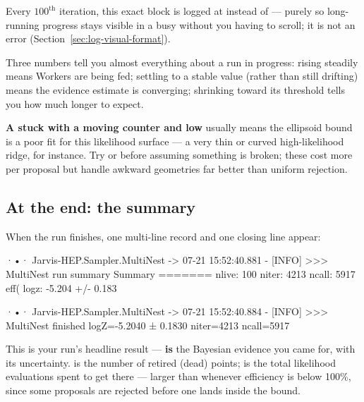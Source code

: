 \begin{jnote}
Every $100^{\text{th}}$ iteration, this exact block is logged at \code{[WARNING]}
instead of \code{[INFO]} --- purely so long-running progress stays visible in a busy
 without you having to scroll; it is not an error
(Section~\ref{sec:log-visual-format}).
\end{jnote}

\begin{jtip}
Three numbers tell you almost everything about a run in progress:  rising
steadily means Workers are being fed;  settling to a stable value (rather
than still drifting) means the evidence estimate is converging; 
shrinking toward its threshold tells you how much longer to expect.
\end{jtip}

\begin{jwarn}
\textbf{A stuck  with a moving  counter and low }
usually means the ellipsoid bound is a poor fit for this likelihood surface --- a very
thin or curved high-likelihood ridge, for instance. Try  or
 before assuming something is broken; these cost more per
proposal but handle awkward geometries far better than uniform rejection.
\end{jwarn}

\subsection{At the end: the summary}
\label{sec:nested-log-summary}

When the run finishes, one multi-line record and one closing line appear:

\begin{terminal}
\begin{jout}
·•· Jarvis-HEP.Sampler.MultiNest
	-> 07-21 15:52:40.881 - [INFO] >>>
MultiNest run summary
Summary
=======
nlive: 100
niter: 4213
ncall: 5917
eff(%
logz: -5.204 +/- 0.183

·•· Jarvis-HEP.Sampler.MultiNest
	-> 07-21 15:52:40.884 - [INFO] >>>
MultiNest finished logZ=-5.2040 ± 0.1830 niter=4213 ncall=5917
\end{jout}
\end{terminal}

This is your run's headline result ---  \textbf{is} the Bayesian evidence
you came for, with its uncertainty.  is the number of retired (dead)
points;  is the total likelihood evaluations spent to get there --- larger
than  whenever efficiency is below 100\%, since some proposals are
rejected before one lands inside the bound.

